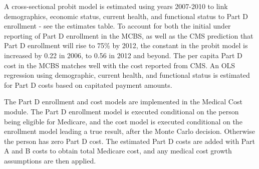 
A cross-sectional probit model is estimated using years 2007-2010 to link demographics, economic status, current health, and 
functional status to Part D enrollment - see the estimates table. To account for both the initial under reporting of Part D 
enrollment in the MCBS, as well as the CMS prediction that Part D enrollment will rise to 75\% by 2012, the constant in the probit model is 
increased by 0.22 in 2006, to 0.56 in 2012 and beyond.  The per capita Part D cost in the MCBS matches well with the cost reported from 
CMS. An OLS regression using demographic, current health, and functional status is estimated for Part D costs based on capitated payment amounts.

The Part D enrollment and cost models are implemented in the Medical Cost module. The Part D enrollment model is executed conditional on 
the person being eligible for Medicare, and the cost model is executed conditional on the enrollment model leading a true result, after the 
Monte Carlo decision. Otherwise the person has zero Part D cost. The estimated Part D costs are added with Part A and B costs to obtain 
total Medicare cost, and any medical cost growth assumptions are then applied.

